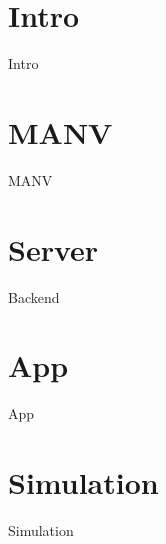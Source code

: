 %
%
\section{Intro}\label{sec:intro}

\begin{frame}{Intro}
\end{frame}


%
%
\section{MANV}

\begin{frame}
	\tableofcontents[currentsection]
\end{frame}

\begin{frame}{MANV}
\end{frame}


%
%
\section{Server}

\begin{frame}
	\tableofcontents[currentsection]
\end{frame}

\begin{frame}{Backend}
\end{frame}


%
%
\section{App}

\begin{frame}
	\tableofcontents[currentsection]
\end{frame}

\begin{frame}{App}
\end{frame}


%
%
\section{Simulation}

\begin{frame}
	\tableofcontents[currentsection]
\end{frame}

\begin{frame}{Simulation}
\end{frame}

